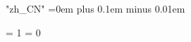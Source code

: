     \XeTeXlinebreaklocale "zh_CN"
    \XeTeXlinebreakskip=0em plus 0.1em minus 0.01em

    \ifx\XeTeXgenerateactualtext\thisisundefined
    \else
    \fi

  \fi %

  \iftxinativeunicodecapable


    \let\alphabeticrm\rm
    \gdef\rm{\alphabeticrm\tenmc}

    \let\alphabeticit\it
    \gdef\it{\alphabeticit\tenmc}

    \let\alphabeticsl\sl
    \gdef\sl{\alphabeticsl\tengt}

    \let\alphabeticbf\bf
    \gdef\bf{\alphabeticbf\tengt}

    \let\alphabetictt\tt
    \gdef\tt{\alphabetictt\tengt}


    \let\alphabetictextfonts\textfonts
    \gdef\textfonts{%
      \alphabetictextfonts
      \let\tenmc\textmc
      \let\tengt\textgt
    }

    \let\alphabetictitlefonts\titlefonts
    \gdef\titlefonts{%
      \alphabetictitlefonts
      \let\tenmc\titlemc
      \let\tengt\titlegt
    }

    \let\alphabeticchapfonts\chapfonts
    \gdef\chapfonts{%
      \alphabeticchapfonts
      \let\tenmc\chapmc
      \let\tengt\chapgt
    }

    \let\alphabeticsecfonts\secfonts
    \gdef\secfonts{%
      \alphabeticsecfonts
      \let\tenmc\secmc
      \let\tengt\secgt
    }

    \let\alphabeticsubsecfonts\subsecfonts
    \gdef\subsecfonts{%
      \alphabeticsubsecfonts
      \let\tenmc\ssecmc
      \let\tengt\ssecgt
    }

    \global\let\subsubsecfonts\subsecfonts

    \let\alphabeticreducedfonts\reducedfonts
    \gdef\reducedfonts{%
      \alphabeticreducedfonts
      \let\tenmc\reducedmc
      \let\tengt\reducedgt
    }

    \let\alphabeticsmallfonts\smallfonts
    \gdef\smallfonts{%
      \alphabeticsmallfonts
      \let\tenmc\smallmc
      \let\tengt\smallgt
    }

    \let\alphabeticsmallerfonts\smallerfonts
    \gdef\smallerfonts{%
      \alphabeticsmallerfonts
      \let\tenmc\smallermc
      \let\tengt\smallergt
    }

    \let\smallexamplefonts\smallfonts


    \globaldefs = 1
    \globaldefs = 0

  \fi %

\fi %
